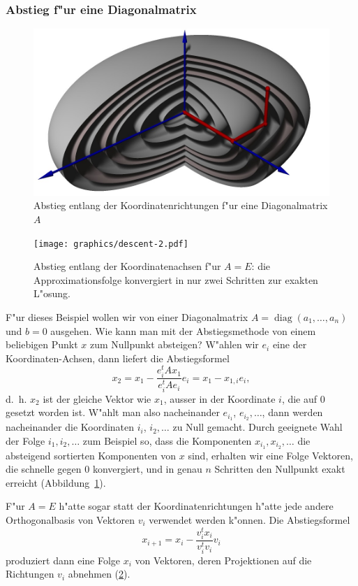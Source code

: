 \subsubsection{Abstieg f"ur eine Diagonalmatrix}
\begin{figure}
\includegraphics[width=\hsize]{graphics/descent3d.jpg}
\caption{Abstieg entlang der Koordinatenrichtungen f"ur eine Diagonalmatrix
$A$
\label{descent3d}}
\end{figure}
\begin{figure}
\begin{center}
\texttt{[image: graphics/descent-2.pdf]}
\end{center}
\caption{Abstieg entlang der Koordinatenachsen f"ur $A=E$:
die Approximationsfolge konvergiert in nur zwei Schritten zur exakten
L"osung.
\label{descent:exact}}
\end{figure}
F"ur dieses Beispiel wollen wir von einer Diagonalmatrix
$A=\operatorname{diag}(a_1,\dots,a_n)$ und $b=0$ ausgehen.
Wie kann man mit der Abstiegsmethode von einem beliebigen Punkt $x$
zum Nullpunkt absteigen?
W"ahlen wir $e_i$ eine der Koordinaten-Achsen, dann liefert die
Abstiegsformel
\[
x_2=x_1-\frac{e_i^tAx_1}{e_i^tAe_i}e_i
=x_1-x_{1,i}e_i,
\]
d.~h. $x_2$ ist der gleiche Vektor wie $x_1$, ausser in der Koordinate $i$,
die auf $0$ gesetzt worden ist.
W"ahlt man also nacheinander $e_{i_1}$, $e_{i_2},\dots$, dann werden
nacheinander die Koordinaten $i_i$, $i_2,\dots$ zu Null gemacht.
Durch geeignete Wahl der Folge $i_1,i_2,\dots$ zum Beispiel so,
dass die Komponenten $x_{i_1},x_{i_2},\dots$ die absteigend sortierten
Komponenten von $x$ sind, erhalten wir eine Folge Vektoren, die schnelle
gegen $0$ konvergiert, und in genau $n$ Schritten den Nullpunkt exakt
erreicht (Abbildung~\ref{descent3d}).

F"ur $A=E$ h"atte sogar
statt der Koordinatenrichtungen h"atte jede andere Orthogonalbasis
von Vektoren $v_i$ verwendet werden k"onnen. Die Abstiegsformel
\[
x_{i+1}=x_i-\frac{v_i^tx_i}{v_i^tv_i}v_i
\]
produziert dann eine Folge $x_i$ von Vektoren, deren Projektionen auf die
Richtungen $v_i$ abnehmen (\ref{descent:exact}).

